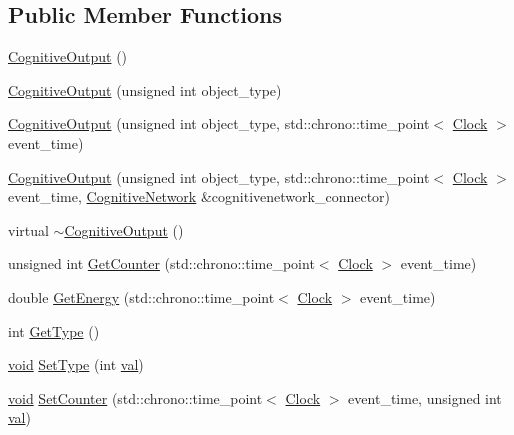 \subsection*{Public Member Functions}
\begin{DoxyCompactItemize}
\item 
\mbox{\hyperlink{class_cognitive_output_a743042cff5c36a76cd975767358e1bbf}{Cognitive\+Output}} ()
\item 
\mbox{\hyperlink{class_cognitive_output_af1fca516a8a90913760e8ac5431f6f70}{Cognitive\+Output}} (unsigned int object\+\_\+type)
\item 
\mbox{\hyperlink{class_cognitive_output_a4751f511d329c66ed80a3c127e5e9e6d}{Cognitive\+Output}} (unsigned int object\+\_\+type, std\+::chrono\+::time\+\_\+point$<$ \mbox{\hyperlink{universe_8h_a0ef8d951d1ca5ab3cfaf7ab4c7a6fd80}{Clock}} $>$ event\+\_\+time)
\item 
\mbox{\hyperlink{class_cognitive_output_a9874901c7b49a6bb495d34c84fdbf651}{Cognitive\+Output}} (unsigned int object\+\_\+type, std\+::chrono\+::time\+\_\+point$<$ \mbox{\hyperlink{universe_8h_a0ef8d951d1ca5ab3cfaf7ab4c7a6fd80}{Clock}} $>$ event\+\_\+time, \mbox{\hyperlink{class_cognitive_network}{Cognitive\+Network}} \&cognitivenetwork\+\_\+connector)
\item 
virtual \mbox{\hyperlink{class_cognitive_output_aefe310a8577684210d82236033791036}{$\sim$\+Cognitive\+Output}} ()
\item 
unsigned int \mbox{\hyperlink{class_cognitive_output_a73efe6441491eb54df2f4dbd78b3903e}{Get\+Counter}} (std\+::chrono\+::time\+\_\+point$<$ \mbox{\hyperlink{universe_8h_a0ef8d951d1ca5ab3cfaf7ab4c7a6fd80}{Clock}} $>$ event\+\_\+time)
\item 
double \mbox{\hyperlink{class_cognitive_output_abb923045db565ecdbac431469217cebf}{Get\+Energy}} (std\+::chrono\+::time\+\_\+point$<$ \mbox{\hyperlink{universe_8h_a0ef8d951d1ca5ab3cfaf7ab4c7a6fd80}{Clock}} $>$ event\+\_\+time)
\item 
int \mbox{\hyperlink{class_cognitive_output_ac5ead5e6a98556d6779eda5679b69594}{Get\+Type}} ()
\item 
\mbox{\hyperlink{glad_8h_a950fc91edb4504f62f1c577bf4727c29}{void}} \mbox{\hyperlink{class_cognitive_output_ac76f41ab3b65ea466e9e2999270f2e5a}{Set\+Type}} (int \mbox{\hyperlink{glad_8h_a26942fd2ed566ef553eae82d2c109c8f}{val}})
\item 
\mbox{\hyperlink{glad_8h_a950fc91edb4504f62f1c577bf4727c29}{void}} \mbox{\hyperlink{class_cognitive_output_a087e8bdab9eb6020dbbe6d47f524c8b6}{Set\+Counter}} (std\+::chrono\+::time\+\_\+point$<$ \mbox{\hyperlink{universe_8h_a0ef8d951d1ca5ab3cfaf7ab4c7a6fd80}{Clock}} $>$ event\+\_\+time, unsigned int \mbox{\hyperlink{glad_8h_a26942fd2ed566ef553eae82d2c109c8f}{val}})

\end{DoxyCompactItemize}
